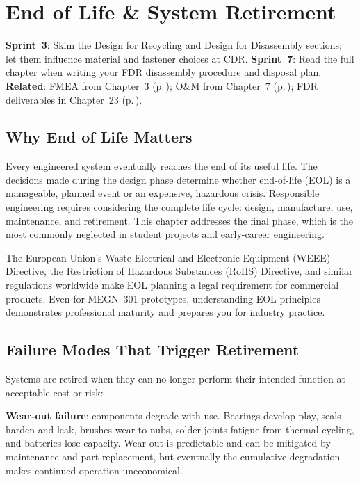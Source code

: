 \documentclass[11pt,letterpaper,twoside,openany]{book}
\begin{document}
\chapter{End of Life \& System Retirement}\label{ch:eol}

\begin{tipbox}
\textbf{Sprint~3}: Skim the Design for Recycling and Design for Disassembly sections; let them influence material and fastener choices at CDR. \textbf{Sprint~7}: Read the full chapter when writing your FDR disassembly procedure and disposal plan. \textbf{Related}: FMEA from Chapter~3 (p.\,\pageref{ch:requirements}); O\&M from Chapter~7 (p.\,\pageref{ch:oandm}); FDR deliverables in Chapter~23 (p.\,\pageref{ch:fdr}).
\end{tipbox}

\section{Why End of Life Matters}
Every engineered system eventually reaches the end of its useful life. The decisions made during the design phase determine whether end-of-life (EOL) is a manageable, planned event or an expensive, hazardous crisis. Responsible engineering requires considering the complete life cycle: design, manufacture, use, maintenance, and retirement. This chapter addresses the final phase, which is the most commonly neglected in student projects and early-career engineering.

The European Union's Waste Electrical and Electronic Equipment (WEEE) Directive, the Restriction of Hazardous Substances (RoHS) Directive, and similar regulations worldwide make EOL planning a legal requirement for commercial products. Even for MEGN~301 prototypes, understanding EOL principles demonstrates professional maturity and prepares you for industry practice.

\section{Failure Modes That Trigger Retirement}
Systems are retired when they can no longer perform their intended function at acceptable cost or risk:

\textbf{Wear-out failure}: components degrade with use. Bearings develop play, seals harden and leak, brushes wear to nubs, solder joints fatigue from thermal cycling, and batteries lose capacity. Wear-out is predictable and can be mitigated by maintenance and part replacement, but eventually the cumulative degradation makes continued operation uneconomical.
\end{document}

